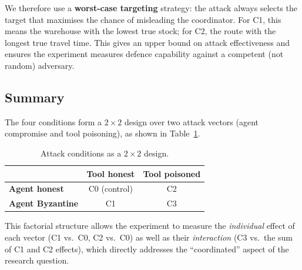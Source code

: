 We therefore use a \textbf{worst-case targeting} strategy:
the attack always selects the target that maximises the chance of
misleading the coordinator.  For C1, this means the warehouse with
the lowest true stock; for C2, the route with the longest true
travel time.  This gives an upper bound on attack effectiveness
and ensures the experiment measures defence capability against
a competent (not random) adversary.

\subsection{Summary}

The four conditions form a $2 \times 2$ design over two attack
vectors (agent compromise and tool poisoning), as shown in
Table~\ref{tab:attack-2x2}.

\begin{table}[htbp]
\centering
\caption{Attack conditions as a $2 \times 2$ design.}
\label{tab:attack-2x2}
\begin{tabular}{l c c}
\hline
 & \textbf{Tool honest} & \textbf{Tool poisoned} \\
\hline
\textbf{Agent honest}      & C0 (control) & C2 \\
\textbf{Agent Byzantine}   & C1           & C3 \\
\hline
\end{tabular}
\end{table}

\noindent
This factorial structure allows the experiment to measure the
\emph{individual} effect of each vector (C1 vs.\ C0, C2 vs.\ C0)
as well as their \emph{interaction} (C3 vs.\ the sum of C1 and C2
effects), which directly addresses the ``coordinated'' aspect of
the research question.
